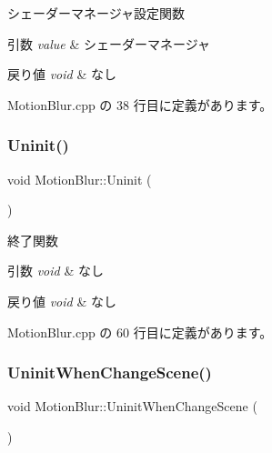 シェーダーマネージャ設定関数 


\begin{DoxyParams}{引数}
{\em value} & シェーダーマネージャ \\
\hline
\end{DoxyParams}

\begin{DoxyRetVals}{戻り値}
{\em void} & なし \\
\hline
\end{DoxyRetVals}


 Motion\+Blur.\+cpp の 38 行目に定義があります。

\mbox{\label{class_motion_blur_a4bceb3a1e625653a0037af10fa5cf422}} 
\subsubsection{\texorpdfstring{Uninit()}{Uninit()}}
{\footnotesize\ttfamily void Motion\+Blur\+::\+Uninit (\begin{DoxyParamCaption}{ }\end{DoxyParamCaption})}



終了関数 


\begin{DoxyParams}{引数}
{\em void} & なし \\
\hline
\end{DoxyParams}

\begin{DoxyRetVals}{戻り値}
{\em void} & なし \\
\hline
\end{DoxyRetVals}


 Motion\+Blur.\+cpp の 60 行目に定義があります。

\mbox{\label{class_motion_blur_ada6365aa40bddda3adf76695e9651e89}} 
\subsubsection{\texorpdfstring{Uninit\+When\+Change\+Scene()}{UninitWhenChangeScene()}}
{\footnotesize\ttfamily void Motion\+Blur\+::\+Uninit\+When\+Change\+Scene (\begin{DoxyParamCaption}{ }\end{DoxyParamCaption})}



